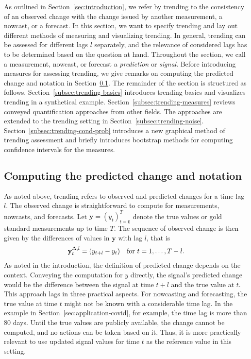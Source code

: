 
As outlined in Section~\ref{sec:introduction}, we refer by trending to the consistency of an observed change with the change issued by another measurement, a nowcast, or a forecast.
In this section, we want to specify trending and lay out different methods of measuring and visualizing trending. 
In general, trending can be assessed for different lags $l$ separately, and the relevance of considered lags has to be determined based on the question at hand.
Throughout the section, we call a measurement, nowcast, or forecast a \textit{prediction} or \textit{signal}.
Before introducing measures for assessing trending, we give remarks on computing the predicted change and notation in Section~\ref{subsec:notation}.
The remainder of the section is structured as follows.
Section~\ref{subsec:trending-basics} introduces trending basics and visualizes trending in a synthetical example.
Section~\ref{subsec:trending-measures} reviews conveyed quantification approaches from other fields.
The approaches are extended to the trending setting in Section~\ref{subsec:trending-noise}.
Section~\ref{subsec:trending-cond-prob} introduces a new graphical method of trending assessment and briefly introduces bootstrap methods for computing confidence intervals for the measures.

\subsection{Computing the predicted change and notation}\label{subsec:notation}

As noted above, trending refers to observed and predicted changes for a time lag $l$.
The observed change is straightforward to compute for measurements, nowcasts, and forecasts.
Let $\mathbf{y} = (y_t)_{t=0}^T$ denote the true values or gold standard measurements up to time $T$.
The sequence of observed change is then given by the differences of values in $\mathbf{y}$ with lag $l$, that is
\begin{equation}\label{eq:diffy}
    \mathbf{y}^{\Delta,l}_t = (y_{t+l} - y_t) \quad \text{for}\ t = 1, \dots, T - l.
\end{equation}
As noted in the introduction, the definition of predicted change depends on the context.
Conveying the computation for $y$ directly, the signal's predicted change would be the difference between the signal at time $t + l$ and the true value at $t$.
This approach lags in three practical aspects.
For nowcasting and forecasting, the true value at time $t$ might not be known with a considerable time lag.
In the example in Section~\ref{sec:application-covid}, for example, the time lag is more than 80 days.
Until the true values are publicly available, the change cannot be computed, and no actions can be taken based on it.
Thus, it is more practically relevant to use updated signal values for time $t$ as the reference value in this setting.


